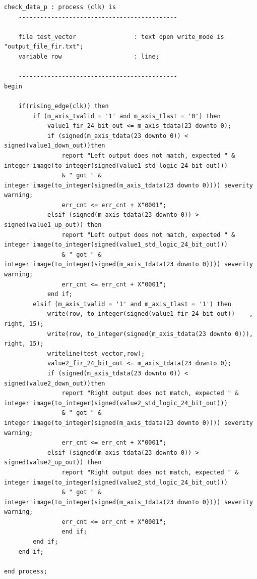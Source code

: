 \documentclass[11pt, a4paper]{article}
\begin{document}
\begin{lstlisting}[style={VHDL-style}]
check_data_p : process (clk) is
    --------------------------------------------

    file test_vector                : text open write_mode is "output_file_fir.txt";
    variable row                    : line;
    
    --------------------------------------------
begin

    if(rising_edge(clk)) then
        if (m_axis_tvalid = '1' and m_axis_tlast = '0') then
            value1_fir_24_bit_out <= m_axis_tdata(23 downto 0);
            if (signed(m_axis_tdata(23 downto 0)) < signed(value1_down_out))then
                report "Left output does not match, expected " & integer'image(to_integer(signed(value1_std_logic_24_bit_out))) 
                & " got " & integer'image(to_integer(signed(m_axis_tdata(23 downto 0)))) severity warning;
                err_cnt <= err_cnt + X"0001";
            elsif (signed(m_axis_tdata(23 downto 0)) > signed(value1_up_out)) then
                report "Left output does not match, expected " & integer'image(to_integer(signed(value1_std_logic_24_bit_out))) 
                & " got " & integer'image(to_integer(signed(m_axis_tdata(23 downto 0)))) severity warning;
                err_cnt <= err_cnt + X"0001";
            end if;
        elsif (m_axis_tvalid = '1' and m_axis_tlast = '1') then
            write(row, to_integer(signed(value1_fir_24_bit_out))    , right, 15);
            write(row, to_integer(signed(m_axis_tdata(23 downto 0))), right, 15);
            writeline(test_vector,row);
            value2_fir_24_bit_out <= m_axis_tdata(23 downto 0);
            if (signed(m_axis_tdata(23 downto 0)) < signed(value2_down_out))then
                report "Right output does not match, expected " & integer'image(to_integer(signed(value2_std_logic_24_bit_out))) 
                & " got " & integer'image(to_integer(signed(m_axis_tdata(23 downto 0)))) severity warning;
                err_cnt <= err_cnt + X"0001";
            elsif (signed(m_axis_tdata(23 downto 0)) > signed(value2_up_out)) then
                report "Right output does not match, expected " & integer'image(to_integer(signed(value2_std_logic_24_bit_out))) 
                & " got " & integer'image(to_integer(signed(m_axis_tdata(23 downto 0)))) severity warning;
                err_cnt <= err_cnt + X"0001";
                end if;
        end if;
    end if;

end process;
\end{lstlisting}
\end{document}
